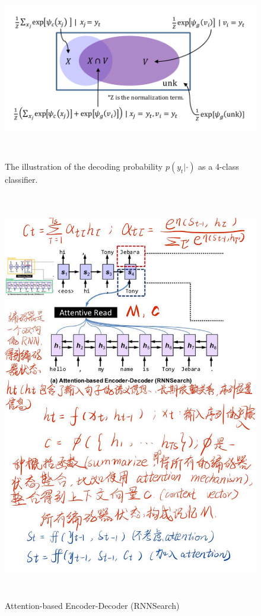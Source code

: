 \documentclass[UTF8]{ctexart}
\begin{document}
        \begin{figure}[htbp]
            \centering
            \vspace{-0.35cm} 
            \includegraphics[width=14cm,height=8cm]{pictures/x.jpg}
            \caption{The illustration of the decoding probability $p(y_t|·)$ as a 4-class classifier.}
        \end{figure}


   
        
    \begin{figure}[htbp]
        \centering
        \vspace{-0.35cm} 
        \includegraphics[width=13cm,height=18cm]{pictures/en.jpg}
        \caption{Attention-based Encoder-Decoder (RNNSearch)}
    \end{figure}
\end{document}
